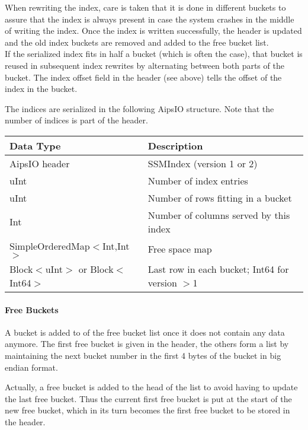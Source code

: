 When rewriting the index, care is taken that it is done in
different buckets to assure that the index is always present in case
the system crashes in the middle of writing the index. Once the index
is written successfully, the header is updated and the old index
  buckets are removed and added to the free bucket list.
\\If the serialized index fits in half a bucket (which is often the
case), that bucket is reused in subsequent index rewrites
by alternating between both parts of the bucket. The index offset
field in the header (see above) tells the offset of the index in the bucket.

The indices are serialized in the following AipsIO structure. Note
  that the number of indices is part of the header.

\vspace{0.15in}
\begin{tabular}{|l|p{13cm}|} \hline
  Data Type & Description \\ \hline\hline
  AipsIO header & SSMIndex (version 1 or 2) \\
  uInt & Number of index entries \\
  uInt & Number of rows fitting in a bucket \\
  Int & Number of columns served by this index \\
  SimpleOrderedMap$<$Int,Int$>$ & Free space map \\
  Block$<$uInt$>$ or Block$<$Int64$>$ & Last row in each bucket; Int64 for version $>$1 \\
  \hline
\end{tabular}
\vspace{0.15in}

\paragraph{Free Buckets\\}
A bucket is added to of the free bucket list once it does not contain any
  data anymore.
The first free bucket is given in the header, the others form a list
  by maintaining the next bucket number in the first 4 bytes of the
  bucket in big endian format.

Actually, a free bucket is added to the head of the list to avoid having to update
  the last free bucket. Thus the current first free bucket is put at
  the start of the new free bucket, which in its turn becomes the
  first free bucket to be stored in the header.


